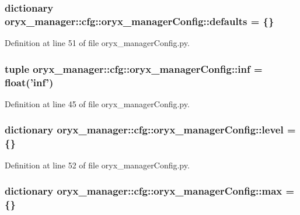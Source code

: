 \subsubsection[{defaults}]{\setlength{\rightskip}{0pt plus 5cm}dictionary {\bf oryx\-\_\-manager\-::cfg\-::oryx\-\_\-manager\-Config\-::defaults} = \{\}}\label{namespaceoryx__manager_1_1cfg_1_1oryx__managerConfig_aa0aeee0336ea1481b9dc02fd57980182}


\-Definition at line 51 of file oryx\-\_\-manager\-Config.\-py.

\subsubsection[{inf}]{\setlength{\rightskip}{0pt plus 5cm}tuple {\bf oryx\-\_\-manager\-::cfg\-::oryx\-\_\-manager\-Config\-::inf} = float('{\bf inf}')}\label{namespaceoryx__manager_1_1cfg_1_1oryx__managerConfig_a40facb9d3871dbcc4befef8c8f302244}


\-Definition at line 45 of file oryx\-\_\-manager\-Config.\-py.

\subsubsection[{level}]{\setlength{\rightskip}{0pt plus 5cm}dictionary {\bf oryx\-\_\-manager\-::cfg\-::oryx\-\_\-manager\-Config\-::level} = \{\}}\label{namespaceoryx__manager_1_1cfg_1_1oryx__managerConfig_ac5a8a1f85e11ab0ca8128be33d1fceca}


\-Definition at line 52 of file oryx\-\_\-manager\-Config.\-py.

\subsubsection[{max}]{\setlength{\rightskip}{0pt plus 5cm}dictionary {\bf oryx\-\_\-manager\-::cfg\-::oryx\-\_\-manager\-Config\-::max} = \{\}}\label{namespaceoryx__manager_1_1cfg_1_1oryx__managerConfig_aa42d9805c2d22edc7aeefda3b9a82821}


